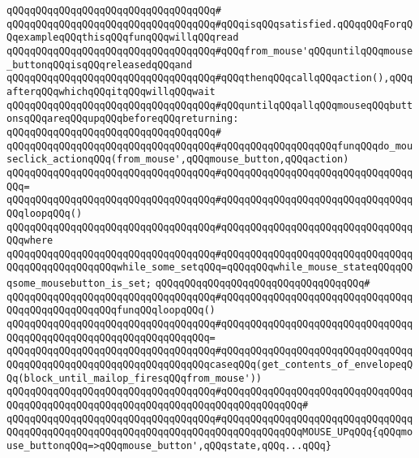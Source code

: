 \verb|qQQqqQQqqQQqqQQqqQQqqQQqqQQqqQQqqQQq#|\newline
\verb|qQQqqQQqqQQqqQQqqQQqqQQqqQQqqQQqqQQq#qQQqisqQQqsatisfied.qQQqqQQqForqQQqexampleqQQqthisqQQqfunqQQqwillqQQqread|\newline
\verb|qQQqqQQqqQQqqQQqqQQqqQQqqQQqqQQqqQQq#qQQqfrom_mouse'qQQquntilqQQqmouse_buttonqQQqisqQQqreleasedqQQqand|\newline
\verb|qQQqqQQqqQQqqQQqqQQqqQQqqQQqqQQqqQQq#qQQqthenqQQqcallqQQqaction(),qQQqafterqQQqwhichqQQqitqQQqwillqQQqwait|\newline
\verb|qQQqqQQqqQQqqQQqqQQqqQQqqQQqqQQqqQQq#qQQquntilqQQqallqQQqmouseqQQqbuttonsqQQqareqQQqupqQQqbeforeqQQqreturning:|\newline
\verb|qQQqqQQqqQQqqQQqqQQqqQQqqQQqqQQqqQQq#|\newline
\verb|qQQqqQQqqQQqqQQqqQQqqQQqqQQqqQQqqQQq#qQQqqQQqqQQqqQQqqQQqfunqQQqdo_mouseclick_actionqQQq(from_mouse',qQQqmouse_button,qQQqaction)|\newline
\verb|qQQqqQQqqQQqqQQqqQQqqQQqqQQqqQQqqQQq#qQQqqQQqqQQqqQQqqQQqqQQqqQQqqQQqqQQq=|\newline
\verb|qQQqqQQqqQQqqQQqqQQqqQQqqQQqqQQqqQQq#qQQqqQQqqQQqqQQqqQQqqQQqqQQqqQQqqQQqloopqQQq()|\newline
\verb|qQQqqQQqqQQqqQQqqQQqqQQqqQQqqQQqqQQq#qQQqqQQqqQQqqQQqqQQqqQQqqQQqqQQqqQQqwhere|\newline
\verb|qQQqqQQqqQQqqQQqqQQqqQQqqQQqqQQqqQQq#qQQqqQQqqQQqqQQqqQQqqQQqqQQqqQQqqQQqqQQqqQQqqQQqqQQqwhile_some_setqQQq=qQQqqQQqwhile_mouse_stateqQQqqQQqsome_mousebutton_is_set;|\newline
\verb|qQQqqQQqqQQqqQQqqQQqqQQqqQQqqQQqqQQq#|\newline
\verb|qQQqqQQqqQQqqQQqqQQqqQQqqQQqqQQqqQQq#qQQqqQQqqQQqqQQqqQQqqQQqqQQqqQQqqQQqqQQqqQQqqQQqqQQqfunqQQqloopqQQq()|\newline
\verb|qQQqqQQqqQQqqQQqqQQqqQQqqQQqqQQqqQQq#qQQqqQQqqQQqqQQqqQQqqQQqqQQqqQQqqQQqqQQqqQQqqQQqqQQqqQQqqQQqqQQqqQQq=|\newline
\verb|qQQqqQQqqQQqqQQqqQQqqQQqqQQqqQQqqQQq#qQQqqQQqqQQqqQQqqQQqqQQqqQQqqQQqqQQqqQQqqQQqqQQqqQQqqQQqqQQqqQQqqQQqcaseqQQq(get_contents_of_envelopeqQQq(block_until_mailop_firesqQQqfrom_mouse'))|\newline
\verb|qQQqqQQqqQQqqQQqqQQqqQQqqQQqqQQqqQQq#qQQqqQQqqQQqqQQqqQQqqQQqqQQqqQQqqQQqqQQqqQQqqQQqqQQqqQQqqQQqqQQqqQQqqQQqqQQqqQQqqQQq#|\newline
\verb|qQQqqQQqqQQqqQQqqQQqqQQqqQQqqQQqqQQq#qQQqqQQqqQQqqQQqqQQqqQQqqQQqqQQqqQQqqQQqqQQqqQQqqQQqqQQqqQQqqQQqqQQqqQQqqQQqqQQqqQQqMOUSE_UPqQQq{qQQqmouse_buttonqQQq=>qQQqmouse_button',qQQqstate,qQQq...qQQq}|\newline
